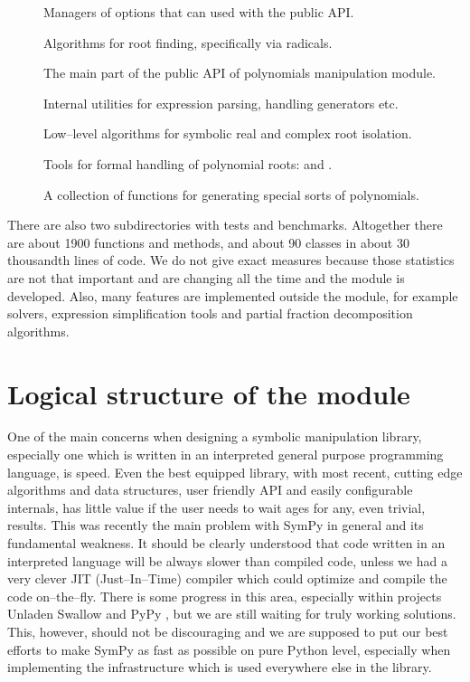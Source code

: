 \begin{description}
\item[] \leavevmode
Managers of options that can used with the public API.

\item[] \leavevmode
Algorithms for root finding, specifically via radicals.

\item[] \leavevmode
The main part of the public API of polynomials manipulation module.

\item[] \leavevmode
Internal utilities for expression parsing, handling generators etc.

\item[] \leavevmode
Low--level algorithms for symbolic real and complex root isolation.

\item[] \leavevmode
Tools for formal handling of polynomial roots:  and .

\item[] \leavevmode
A collection of functions for generating special sorts of polynomials.

\end{description}

There are also two subdirectories with tests and benchmarks. Altogether there are about 1900
functions and methods, and about 90 classes in about 30 thousandth lines of code. We do not
give exact measures because those statistics are not that important and are changing all the
time and the module is developed. Also, many features are implemented outside the module, for
example solvers, expression simplification tools and partial fraction decomposition algorithms.


\section{Logical structure of the module}

One of the main concerns when designing a symbolic manipulation library, especially one which is
written in an interpreted general purpose programming language, is speed. Even the best equipped
library, with most recent, cutting edge algorithms and data structures, user friendly API and
easily configurable internals, has little value if the user needs to wait ages for any, even
trivial, results. This was recently the main problem with SymPy in general and its fundamental
weakness. It should be clearly understood that code written in an interpreted language will be
always slower than compiled code, unless we had a very clever JIT (Just--In--Time) compiler which
could optimize and compile the code on--the--fly. There is some progress in this area, especially
within projects Unladen Swallow \cite{UnladenSwallow} and PyPy \cite{PyPy}, but we are still waiting for
truly working solutions. This, however, should not be discouraging and we are supposed to put our
best efforts to make SymPy as fast as possible on pure Python level, especially when implementing
the infrastructure which is used everywhere else in the library.

